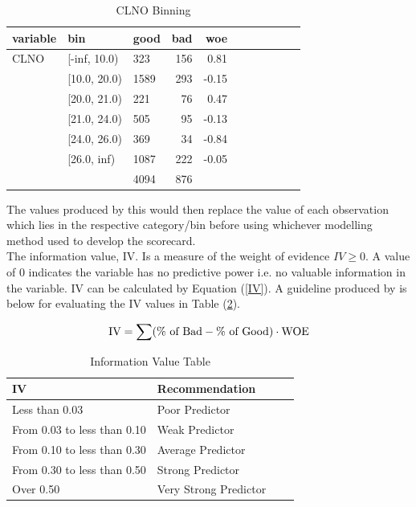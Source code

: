 \begin{table}[H]
\centering
		\begin{tabular}{lllrrrrrrrr}
		\toprule
		variable & bin &  good &  bad  &       woe  \\
		\midrule
		     CLNO &  [-inf, 10.0)  &   323 &  156  &  0.81  \\
		     &  [10.0, 20.0) &  1589 &  293  & -0.15  \\
		     &  [20.0, 21.0)&   221 &   76  &  0.47  \\
		     &  [21.0, 24.0) &   505 &   95  & -0.13 \\
		     &  [24.0, 26.0)&   369 &   34  & -0.84 \\
		     &   [26.0, inf)  &  1087 &  222  & -0.05  \\
		\midrule
		     &		        & 4094 & 876 & \\
		\bottomrule
		\end{tabular}
		\caption{CLNO Binning \label{table:woe_example_table}}
\end{table}

The values produced by this would then replace the value of each observation which lies in the respective category/bin before using whichever modelling method used to develop the scorecard.  \\

The information value, IV. Is a measure of the weight of evidence $IV \geq 0$. A value of 0 indicates the variable has no predictive power i.e. no valuable information in the variable. IV can be calculated by Equation (\ref{IV}). A guideline produced by \parencite{bailey2004credit} is below for evaluating the IV values in Table (\ref{table:IV}).

\begin{equation}\label{IV}
\textup{IV} = \sum (\% \textup{ of Bad} - \% \textup{ of Good}) \cdot \textup{WOE}
\end{equation}

\begin{table}[H]
	\centering
	\begin{tabular}{l l l l}
	IV	&Recommendation \\
	\hline
	Less than 0.03			&Poor Predictor \\
	From 0.03 to less than 0.10	&Weak Predictor \\
	From 0.10 to less than 0.30	&Average Predictor \\
	From 0.30 to less than 0.50	&Strong Predictor \\
	Over 0.50				&Very Strong Predictor \\
	\end{tabular}
	\caption{Information Value Table \label{table:IV}}\parencite{bailey2004credit}
\end{table}

